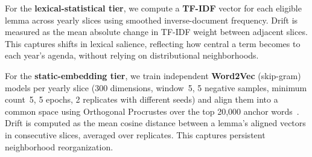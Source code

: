 \documentclass[12pt]{article}
\begin{document}


For the \textbf{lexical-statistical tier}, we compute a \textbf{TF-IDF} vector for each eligible lemma across yearly slices using smoothed inverse-document frequency. Drift is measured as the mean absolute change in TF-IDF weight between adjacent slices. This captures shifts in lexical salience, reflecting how central a term becomes to each year's agenda, without relying on distributional neighborhoods.



For the \textbf{static-embedding tier}, we train independent \textbf{Word2Vec} (skip-gram) models per yearly slice (300 dimensions, window~5, 5 negative samples, minimum count~5, 5 epochs, 2 replicates with different seeds) and align them into a common space using Orthogonal Procrustes over the top 20,000 anchor words~\cite{hamilton-etal-2016-diachronic}. Drift is computed as the mean cosine distance between a lemma's aligned vectors in consecutive slices, averaged over replicates. This captures persistent neighborhood reorganization.

\end{document}
